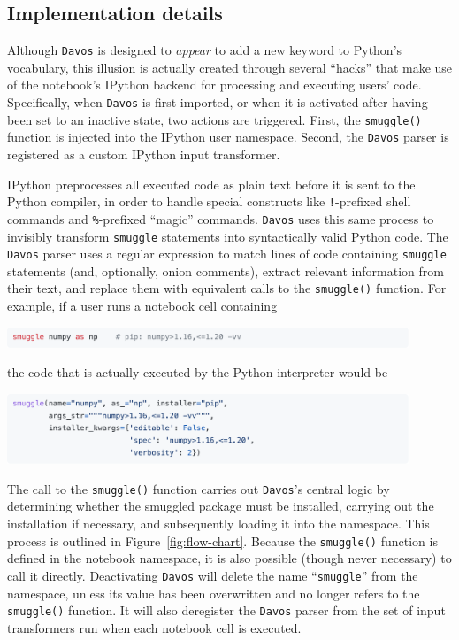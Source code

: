 \documentclass[preprint,12pt,a4paper]{elsarticle}
\begin{document}
\subsection{Implementation details}\label{subsec:implementation}

Although \texttt{Davos} is designed to \textit{appear} to add a new
keyword to Python's vocabulary, this illusion is actually created through
several ``hacks'' that make use of the notebook's IPython backend
for processing and executing users' code.  Specifically, when
\texttt{Davos} is first imported, or when it is activated after having been
set to an inactive state, two actions are triggered.  First, the
\texttt{smuggle()} function is injected into the IPython user
namespace.  Second, the \texttt{Davos} parser is registered as a
custom IPython input transformer.

IPython preprocesses all executed code as plain text before it is sent
to the Python compiler, in order to handle special constructs like
\mbox{\texttt{!}-pre}\-fixed shell commands and \mbox{\texttt{\%}-pre}\-fixed ``magic'' commands. \texttt{Davos} uses
this same process to invisibly transform \texttt{smuggle} statements into
syntactically valid Python code. The \texttt{Davos} parser uses a
regular expression to match lines of code containing \texttt{smuggle}
statements (and, optionally, onion comments), extract relevant
information from their text, and replace them with equivalent calls to
the \texttt{smuggle()} function. For example, if a user runs a
notebook cell containing
\begin{center}
\includegraphics[width=0.9\textwidth]{figs/snippet6}
\end{center}
the code that is actually executed by the Python interpreter would be
\begin{center}
\includegraphics[width=0.9\textwidth]{figs/snippet7}
\end{center}
The call to the \texttt{smuggle()} function carries out
\texttt{Davos}'s central logic by determining whether the smuggled
package must be installed, carrying out the installation if necessary,
and subsequently loading it into the namespace. This process is
outlined in Figure~\ref{fig:flow-chart}. Because the
\texttt{smuggle()} function is defined in the notebook namespace, it
is also possible (though never necessary) to call it
directly. Deactivating \texttt{Davos} will delete the name
``\texttt{smuggle}'' from the namespace, unless its value has been
overwritten and no longer refers to the \texttt{smuggle()}
function. It will also deregister the \texttt{Davos} parser from the
set of input transformers run when each notebook cell is
executed.
\end{document}
